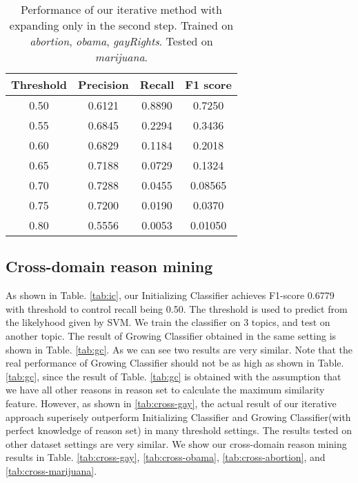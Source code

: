 \documentclass[11pt,a4paper]{article}
\begin{document}
\begin{table*}[h]
\begin{center}
\begin{tabular}{|c||c|c|c|}
\hline \bf Threshold & \bf Precision & \bf Recall & \bf F1 score \\ \hline\hline
0.50 & 0.6121 & 0.8890 & 0.7250 \\
0.55 & 0.6845 & 0.2294 & 0.3436 \\
0.60 & 0.6829 & 0.1184 & 0.2018 \\
0.65 & 0.7188 & 0.0729 & 0.1324 \\
0.70 & 0.7288 & 0.0455 & 0.08565 \\
0.75 & 0.7200 & 0.0190 & 0.0370 \\
0.80 & 0.5556 & 0.0053 & 0.01050 \\ 
\hline
\end{tabular}
\end{center}
\caption{\label{tab:expanding} Performance of our iterative method with expanding only in the second step. Trained on {\it abortion}, {\it obama}, {\it gayRights}. Tested on {\it marijuana}.}
\end{table*}

\subsection{Cross-domain reason mining}

As shown in Table. \ref{tab:ic}, our Initializing Classifier achieves F1-score 0.6779 with threshold to control recall being 0.50. The threshold is used to predict from the likelyhood given by SVM. We train the classifier on 3 topics, and test on another topic. The result of Growing Classifier obtained in the same setting is shown in Table. \ref{tab:gc}. As we can see two results are very similar. Note that the real performance of Growing Classifier should not be as high as shown in Table. \ref{tab:gc}, since the result of Table. \ref{tab:gc} is obtained with the assumption that we have all other reasons in reason set to calculate the maximum similarity feature. However, as shown in \ref{tab:cross-gay}, the actual result of our iterative approach superisely outperform Initializing Classifier and Growing Classifier(with perfect knowledge of reason set) in many threshold settings. The results tested on other dataset settings are very similar. We show our cross-domain reason mining results in Table. \ref{tab:cross-gay}, \ref{tab:cross-obama}, \ref{tab:cross-abortion}, and \ref{tab:cross-marijuana}.
\end{document}
